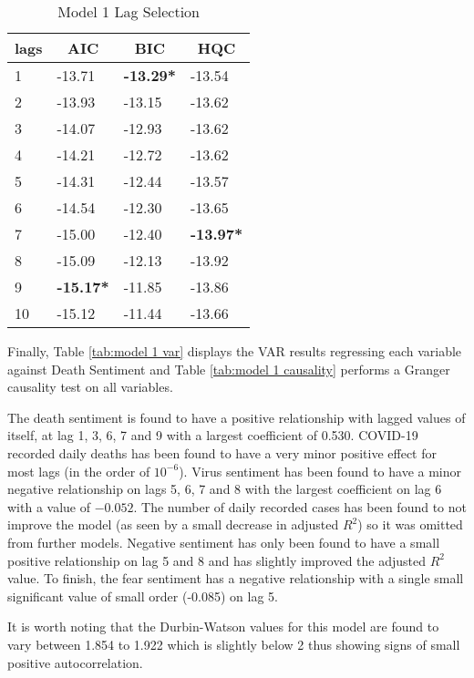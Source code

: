 \begin{table}[H]
\centering
\begin{tabular}{@{}llll@{}}
\toprule
\multicolumn{1}{c}{\textbf{lags}} & \multicolumn{1}{c}{\textbf{AIC}} & \multicolumn{1}{c}{\textbf{BIC}} & \multicolumn{1}{c}{\textbf{HQC}} \\ \midrule
1 & -13.71 & \textbf{-13.29*} & -13.54 \\
2 & -13.93 & -13.15 & -13.62 \\
3 & -14.07 & -12.93 & -13.62 \\
4 & -14.21 & -12.72 & -13.62 \\
5 & -14.31 & -12.44 & -13.57 \\
6 & -14.54 & -12.30 & -13.65 \\
7 & -15.00 & -12.40 & \textbf{-13.97*} \\
8 & -15.09 & -12.13 & -13.92 \\
9 & \textbf{-15.17*} & -11.85 & -13.86 \\
10 & -15.12 & -11.44 & -13.66 \\ \bottomrule
\end{tabular}
\caption{Model 1 Lag Selection}
\label{tab:model 1 lag}
\end{table}

Finally, Table \ref{tab:model 1 var} displays the VAR results regressing each variable against Death Sentiment and Table \ref{tab:model 1 causality} performs a Granger causality test on all variables.

The death sentiment is found to have a positive relationship with lagged values of itself, at lag 1, 3, 6, 7 and 9 with a largest coefficient of 0.530. COVID-19 recorded daily deaths has been found to have a very minor positive effect for most lags (in the order of $10^{-6}$). Virus sentiment has been found to have a minor negative relationship on lags 5, 6, 7 and 8 with the largest coefficient on lag 6 with a value of $-0.052$. The number of daily recorded cases has been found to not improve the model (as seen by a small decrease in adjusted $R^{2}$) so it was omitted from further models. Negative sentiment has only been found to have a small positive relationship on lag 5 and 8 and has slightly improved the adjusted $R^2$ value. To finish, the fear sentiment has a negative relationship with a single small significant value of small order (-0.085) on lag 5.

It is worth noting that the Durbin-Watson values for this model are found to vary between 1.854 to 1.922 which is slightly below 2 thus showing signs of small positive autocorrelation. 

